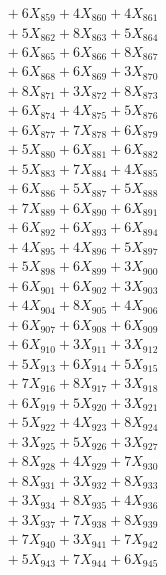 \documentclass[a4paper,10pt]{article}
\begin{document}
{\begin{align}
&\;  + 6 X_{859} + 4 X_{860} + 4 X_{861} \\[0.3ex]
&\;  + 5 X_{862} + 8 X_{863} + 5 X_{864} \\[0.3ex]
&\;  + 6 X_{865} + 6 X_{866} + 8 X_{867} \\[0.3ex]
&\;  + 6 X_{868} + 6 X_{869} + 3 X_{870} \\[0.3ex]
&\;  + 8 X_{871} + 3 X_{872} + 8 X_{873} \\[0.3ex]
&\;  + 6 X_{874} + 4 X_{875} + 5 X_{876} \\[0.3ex]
&\;  + 6 X_{877} + 7 X_{878} + 6 X_{879} \\[0.5ex]\allowbreak
&\;  + 5 X_{880} + 6 X_{881} + 6 X_{882} \\[0.3ex]
&\;  + 5 X_{883} + 7 X_{884} + 4 X_{885} \\[0.3ex]
&\;  + 6 X_{886} + 5 X_{887} + 5 X_{888} \\[0.3ex]
&\;  + 7 X_{889} + 6 X_{890} + 6 X_{891} \\[0.3ex]
&\;  + 6 X_{892} + 6 X_{893} + 6 X_{894} \\[0.3ex]
&\;  + 4 X_{895} + 4 X_{896} + 5 X_{897} \\[0.3ex]
&\;  + 5 X_{898} + 6 X_{899} + 3 X_{900} \\[0.3ex]
&\;  + 6 X_{901} + 6 X_{902} + 3 X_{903} \\[0.3ex]
&\;  + 4 X_{904} + 8 X_{905} + 4 X_{906} \\[0.3ex]
&\;  + 6 X_{907} + 6 X_{908} + 6 X_{909} \\[0.5ex]\allowbreak
&\;  + 6 X_{910} + 3 X_{911} + 3 X_{912} \\[0.3ex]
&\;  + 5 X_{913} + 6 X_{914} + 5 X_{915} \\[0.3ex]
&\;  + 7 X_{916} + 8 X_{917} + 3 X_{918} \\[0.3ex]
&\;  + 6 X_{919} + 5 X_{920} + 3 X_{921} \\[0.3ex]
&\;  + 5 X_{922} + 4 X_{923} + 8 X_{924} \\[0.3ex]
&\;  + 3 X_{925} + 5 X_{926} + 3 X_{927} \\[0.3ex]
&\;  + 8 X_{928} + 4 X_{929} + 7 X_{930} \\[0.3ex]
&\;  + 8 X_{931} + 3 X_{932} + 8 X_{933} \\[0.3ex]
&\;  + 3 X_{934} + 8 X_{935} + 4 X_{936} \\[0.3ex]
&\;  + 3 X_{937} + 7 X_{938} + 8 X_{939} \\[0.5ex]\allowbreak
&\;  + 7 X_{940} + 3 X_{941} + 7 X_{942} \\[0.3ex]
&\;  + 5 X_{943} + 7 X_{944} + 6 X_{945} \\[0.3ex]

\end{align}}
\end{document}
